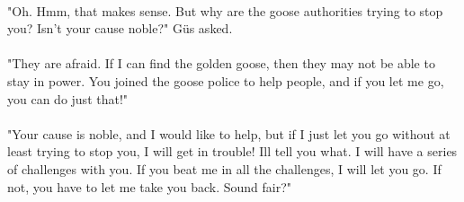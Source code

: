 \documentclass[a4paper,11pt ]{book}
\begin{document}
\paragraph{} "Oh. Hmm, that makes sense. But why are the goose authorities trying to stop you? Isn't your cause noble?" Güs asked.
\paragraph{} "They are afraid. If I can find the golden goose, then they may not be able to stay in power. You joined the goose police to help people, and if you let me go, you can do just that!"
\paragraph{} "Your cause is noble, and I would like to help, but if I just let you go without at least trying to stop you, I will get in trouble! Ill tell you what. I will have a series of challenges with you. If you beat me in all the challenges, I will let you go. If not, you have to let me take you back. Sound fair?"
\end{document}
